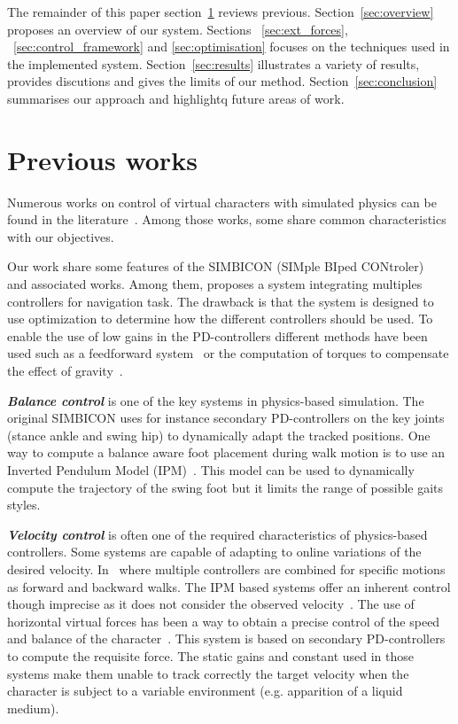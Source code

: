 \documentclass[conference]{acmsiggraph}
\begin{document}
The remainder of this paper section~\ref{sec:previous_works} reviews previous. Section~\ref{sec:overview} proposes an overview of our system. Sections ~\ref{sec:ext_forces}, ~\ref{sec:control_framework} and \ref{sec:optimisation} focuses on the techniques used in the implemented system. Section~\ref{sec:results} illustrates a variety of results, provides discutions and gives the limits of our method. Section~\ref{sec:conclusion} summarises our approach and highlightq future areas of work.
 
\section{Previous works}
\label{sec:previous_works}

Numerous works on control of virtual characters with simulated physics can be found in the literature~\cite{geijtenbeek2012interactive}. Among those works, some share common characteristics with our objectives.

Our work share some features of the SIMBICON (SIMple BIped CONtroler)~\cite{yin2007simbicon} and associated works. Among them, \cite{coros2009robust} proposes a system integrating multiples controllers for navigation task. The drawback is that the system is designed to use optimization to determine how the different controllers should be used. To enable the use of low gains in the PD-controllers different methods have been used such as a feedforward system~\cite{yin2007simbicon} or the computation of torques to compensate the effect of gravity~\cite{coros2010generalized}.

\textbf{\textit{Balance control}} is one of the key systems in physics-based simulation. The original SIMBICON uses for instance secondary PD-controllers on the key joints (stance ankle and swing hip) to dynamically adapt the tracked positions. One way to compute a balance aware foot placement during walk motion is to use an Inverted Pendulum Model (IPM)~\cite{coros2010generalized,kajita20013d}. This model can be used to dynamically compute the trajectory of the swing foot but it limits the range of possible gaits styles.

\textbf{\textit{Velocity control}} is often one of the required characteristics of physics-based controllers. Some systems are capable of adapting to online variations of the desired velocity. In~\cite{coros2009robust} where multiple controllers are combined for specific motions as forward and backward walks. The IPM based systems offer an inherent control though imprecise as it does not consider the observed velocity~\cite{coros2010generalized}. The use of horizontal virtual forces has been a way to obtain a precise control of the speed and balance of the character~\cite{coros2010generalized,geijtenbeek2012simple}. This system is based on secondary PD-controllers to compute the requisite force. The static gains and constant used in those systems make them unable to track correctly the target velocity when the character is subject to a variable environment (e.g. apparition of a liquid medium). 
\end{document}
